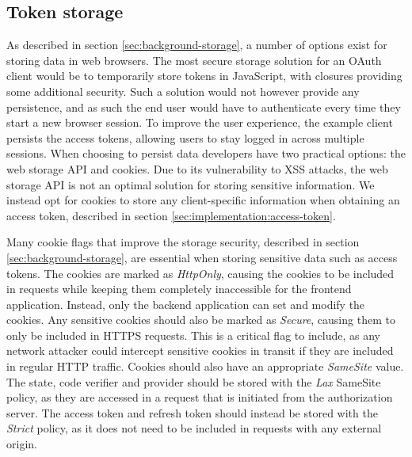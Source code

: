 \subsection{Token storage}
\label{sec:implementation-storage}
As described in section \ref{sec:background-storage}, a number of options exist for storing data in web browsers.
The most secure storage solution for an OAuth client would be to temporarily store tokens in JavaScript, with closures providing some additional security.
Such a solution would not however provide any persistence, and as such the end user would have to authenticate every time they start a new browser session.
To improve the user experience, the example client persists the access tokens, allowing users to stay logged in across multiple sessions.
When choosing to persist data developers have two practical options: the web storage API and cookies.
Due to its vulnerability to XSS attacks, the web storage API is not an optimal solution for storing sensitive information.
We instead opt for cookies to store any client-specific information when obtaining an access token, described in section \ref{sec:implementation:access-token}.

Many cookie flags that improve the storage security, described in section \ref{sec:background-storage}, are essential when storing sensitive data such as access tokens.
The cookies are marked as \textit{HttpOnly}, causing the cookies to be included in requests while keeping them completely inaccessible for the frontend application.
Instead, only the backend application can set and modify the cookies.
Any sensitive cookies should also be marked as \textit{Secure}, causing them to only be included in HTTPS requests.
This is a critical flag to include, as any network attacker could intercept sensitive cookies in transit if they are included in regular HTTP traffic.
Cookies should also have an appropriate \textit{SameSite} value.
The state, code verifier and provider should be stored with the \textit{Lax} SameSite policy, as they are accessed in a request that is initiated from the authorization server.
The access token and refresh token should instead be stored with the \textit{Strict} policy, as it does not need to be included in requests with any external origin.

